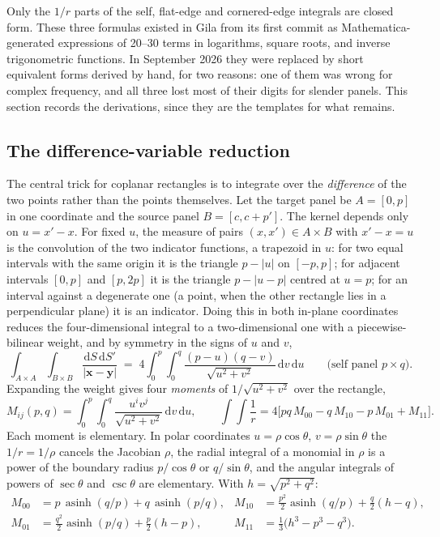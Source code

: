 \documentclass[11pt]{article}
\theoremstyle{remark}
\newcommand{\dd}{\mathrm{d}}
\newcommand{\asinh}{\operatorname{asinh}}
\begin{document}
Only the $1/r$ parts of the self, flat-edge and cornered-edge integrals are closed
form. These three formulas existed in Gila from its first commit as
Mathematica-generated expressions of 20--30 terms in logarithms, square roots, and
inverse trigonometric functions. In September 2026 they were replaced by short
equivalent forms derived by hand, for two reasons: one of them was wrong for complex
frequency, and all three lost most of their digits for slender panels. This section
records the derivations, since they are the templates for what remains.

\subsection{The difference-variable reduction}
\label{sec:diffvar}

The central trick for coplanar rectangles is to integrate over the \emph{difference}
of the two points rather than the points themselves. Let the target panel be
$A = [0,p]$ in one coordinate and the source panel $B = [c, c+p']$. The kernel depends
only on $u = x' - x$. For fixed $u$, the measure of pairs $(x, x')\in A\times B$ with
$x'-x = u$ is the convolution of the two indicator functions, a trapezoid in $u$: for
two equal intervals with the same origin it is the triangle $p - |u|$ on $[-p,p]$; for
adjacent intervals $[0,p]$ and $[p,2p]$ it is the triangle $p - |u - p|$ centred at
$u = p$; for an interval against a degenerate one (a point, when the other rectangle
lies in a perpendicular plane) it is an indicator. Doing this in both in-plane
coordinates reduces the four-dimensional integral to a two-dimensional one with a
piecewise-bilinear weight, and by symmetry in the signs of $u$ and $v$,
\begin{equation}
\int_{A\times A}\!\int_{B\times B}\frac{\dd S\,\dd S'}{|\mathbf{x}-\mathbf{y}|}
\;=\; 4\int_0^{p}\!\!\int_0^{q}\frac{(p-u)(q-v)}{\sqrt{u^2+v^2}}\,\dd v\,\dd u
\qquad\text{(self panel } p\times q\text{)} .
\end{equation}
Expanding the weight gives four \emph{moments} of $1/\sqrt{u^2+v^2}$ over the
rectangle,
\begin{equation}
M_{ij}(p,q) = \int_0^p\!\!\int_0^q \frac{u^i v^j}{\sqrt{u^2+v^2}}\,\dd v\,\dd u,
\qquad
\int\!\!\int\frac{1}{r} = 4\bigl[pq\,M_{00} - q\,M_{10} - p\,M_{01} + M_{11}\bigr].
\end{equation}
Each moment is elementary. In polar coordinates $u = \rho\cos\theta$, $v =
\rho\sin\theta$ the $1/r = 1/\rho$ cancels the Jacobian $\rho$, the radial integral of
a monomial in $\rho$ is a power of the boundary radius $p/\cos\theta$ or $q/\sin\theta$,
and the angular integrals of powers of $\sec\theta$ and $\csc\theta$ are elementary.
With $h = \sqrt{p^2+q^2}$:
\begin{equation}
\begin{aligned}
M_{00} &= p\,\asinh(q/p) + q\,\asinh(p/q), &
M_{10} &= \tfrac{p^2}{2}\asinh(q/p) + \tfrac{q}{2}(h-q), \\
M_{01} &= \tfrac{q^2}{2}\asinh(p/q) + \tfrac{p}{2}(h-p), &
M_{11} &= \tfrac{1}{3}\bigl(h^3 - p^3 - q^3\bigr).
\end{aligned}
\label{eq:moments}
\end{equation}
\end{document}
